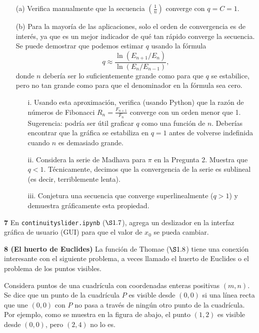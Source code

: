 \documentclass{article}
\begin{document}
\begin{itemize}
    \item[(a)] Verifica manualmente que la secuencia \(\left(\frac{1}{n}\right)\) converge con \(q = C = 1\).
    
    \item[(b)] Para la mayoría de las aplicaciones, solo el orden de convergencia es de interés, ya que es un mejor indicador de qué tan rápido converge la secuencia. Se puede demostrar que podemos estimar \(q\) usando la fórmula
    \[
    q \approx \frac{\ln(E_{n+1}/E_n)}{\ln(E_n/E_{n-1})},
    \]
    donde \(n\) debería ser lo suficientemente grande como para que \(q\) se estabilice, pero no tan grande como para que el denominador en la fórmula sea cero.
    
    \begin{itemize}
        \item[i.] Usando esta aproximación, verifica (usando Python) que la razón de números de Fibonacci \(R_n = \frac{F_{n+1}}{F_n}\) converge con un orden menor que 1.  
        Sugerencia: podría ser útil graficar \(q\) como una función de \(n\). Deberías encontrar que la gráfica se estabiliza en \(q = 1\) antes de volverse indefinida cuando \(n\) es demasiado grande.
        
        \item[ii.] Considera la serie de Madhava para \(\pi\) en la Pregunta 2. Muestra que \(q < 1\).  
        Técnicamente, decimos que la convergencia de la serie es sublineal (es decir, terriblemente lenta).
        
        \item[iii.] Conjetura una secuencia que converge superlinealmente (\(q > 1\)) y demuestra gráficamente esta propiedad.
    \end{itemize}
\end{itemize}

\textbf{7} En \texttt{continuityslider.ipynb} (\(\S 1.7\)), agrega un deslizador en la interfaz gráfica de usuario (GUI) para que el valor de \(x_0\) se pueda cambiar.

\textbf{8 (El huerto de Euclides)} La función de Thomae (\(\S 1.8\)) tiene una conexión interesante con el siguiente problema, a veces llamado el huerto de Euclides o el problema de los puntos visibles.

Considera puntos de una cuadrícula con coordenadas enteras positivas \((m, n)\). Se dice que un punto de la cuadrícula \(P\) es visible desde \((0,0)\) si una línea recta que une \((0,0)\) con \(P\) no pasa a través de ningún otro punto de la cuadrícula. Por ejemplo, como se muestra en la figura de abajo, el punto \((1, 2)\) es visible desde \((0,0)\), pero \((2, 4)\) no lo es.
\end{document}
